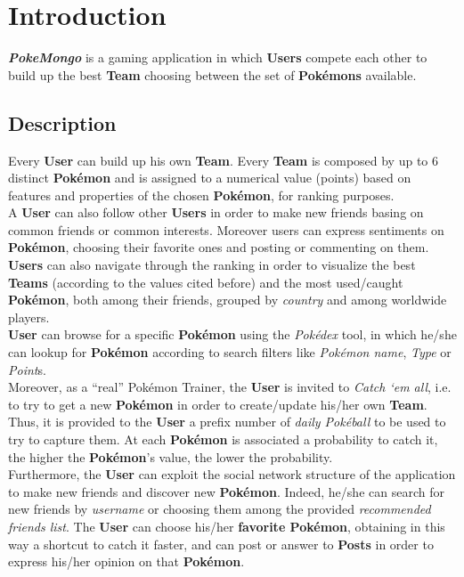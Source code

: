 \section{Introduction}
\textbf{\textit{PokeMongo}} is a gaming application in which \textbf{Users} compete each other to build up the best \textbf{Team} choosing between the set of \textbf{Pokémons} available. 

\subsection{Description}
Every \textbf{User} can build up his own \textbf{Team}. Every \textbf{Team} is composed by up to 6 distinct \textbf{Pokémon} and is assigned to a numerical value (points) based on features and properties of the chosen \textbf{Pokémon}, for ranking purposes.\medskip \\
A \textbf{User} can also follow other \textbf{Users} in order to make new friends basing on common friends or common interests. Moreover users can express sentiments on \textbf{Pokémon}, choosing their favorite ones and posting or commenting on them. \medskip \\
\textbf{Users} can also navigate through the ranking in order to visualize the best \textbf{Teams} (according to the values cited before) and the most used/caught \textbf{Pokémon}, both among their friends, grouped by \textit{country} and among worldwide players.\medskip \\
\textbf{User} can browse for a specific \textbf{Pokémon} using the \textit{Pokédex} tool, in which he/she can lookup for \textbf{Pokémon} according to search filters like \textit{Pokémon name}, \textit{Type} or \textit{Point}s.\medskip \\
Moreover, as a “real” Pokémon Trainer, the \textbf{User} is invited to \textit{Catch ‘em all}, i.e. to try to get a new \textbf{Pokémon} in order to create/update his/her own \textbf{Team}. Thus, it is provided to the \textbf{User} a prefix number of \textit{daily Pokéball} to be used to try to capture them. At each \textbf{Pokémon} is associated a probability to catch it, the higher the \textbf{Pokémon}’s value, the lower the probability.\medskip \\
Furthermore, the \textbf{User} can exploit the social network structure of the application to make new friends and discover new \textbf{Pokémon}. Indeed, he/she can search for new friends by \textit{username} or choosing them among the provided \textit{recommended friends list}. 
The \textbf{User} can choose his/her \textbf{favorite Pokémon}, obtaining in this way a shortcut to catch it faster, and can post or answer to \textbf{Posts} in order to express his/her opinion on that \textbf{Pokémon}. \medskip \\
